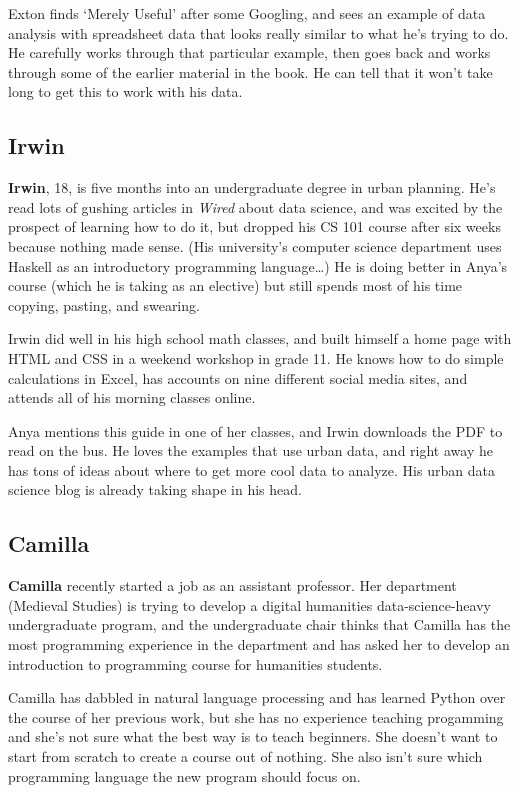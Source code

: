 \documentclass[]{Nemilov}
\begin{document}
Exton finds `Merely Useful' after some Googling,
and sees an example of data analysis with spreadsheet data that looks really similar to what he's trying to do.
He carefully works through that particular example,
then goes back and works through some of the earlier material in the book.
He can tell that it won't take long to get this to work with his data.

\hypertarget{irwin}{%
\subsection{Irwin}\label{irwin}}

\textbf{Irwin}, 18, is five months into an undergraduate degree in urban planning.
He's read lots of gushing articles in \emph{Wired} about data science,
and was excited by the prospect of learning how to do it,
but dropped his CS 101 course after six weeks because nothing made sense.
(His university's computer science department uses Haskell as an introductory programming language\ldots{})
He is doing better in Anya's course (which he is taking as an elective)
but still spends most of his time copying, pasting, and swearing.

Irwin did well in his high school math classes,
and built himself a home page with HTML and CSS in a weekend workshop in grade 11.
He knows how to do simple calculations in Excel,
has accounts on nine different social media sites,
and attends all of his morning classes online.

Anya mentions this guide in one of her classes,
and Irwin downloads the PDF to read on the bus.
He loves the examples that use urban data,
and right away he has tons of ideas about where to get more cool data to analyze.
His urban data science blog is already taking shape in his head.

\hypertarget{camilla}{%
\subsection{Camilla}\label{camilla}}

\textbf{Camilla} recently started a job as an assistant professor.
Her department (Medieval Studies) is trying to develop a digital humanities data-science-heavy undergraduate program,
and the undergraduate chair thinks that Camilla has the most programming experience in the department
and has asked her to develop an introduction to programming course for humanities students.

Camilla has dabbled in natural language processing and has learned Python over the course of her previous work,
but she has no experience teaching progamming
and she's not sure what the best way is to teach beginners.
She doesn't want to start from scratch to create a course out of nothing.
She also isn't sure which programming language the new program should focus on.
\end{document}
